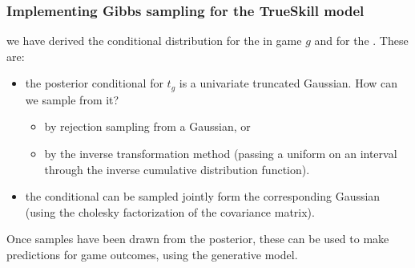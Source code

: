 \begin{frame}
\frametitle{Implementing Gibbs sampling for the TrueSkill model}

we have derived the conditional distribution for the  in game $g$ and for the . These are:
\begin{itemize}
\item the posterior conditional  for $t_g$ is a
  univariate truncated Gaussian. How can we sample from it?
\begin{itemize}
\item by rejection sampling from a Gaussian, or
\item by the inverse transformation method (passing a uniform on an
  interval through the inverse cumulative distribution function).
\end{itemize}
\item the conditional  can be sampled jointly form the
  corresponding Gaussian (using the cholesky factorization of the
  covariance matrix).
\end{itemize}

Once samples have been drawn from the posterior, these can be used to
make predictions for game outcomes, using the generative model.\\
\hfill{}
\end{frame}




